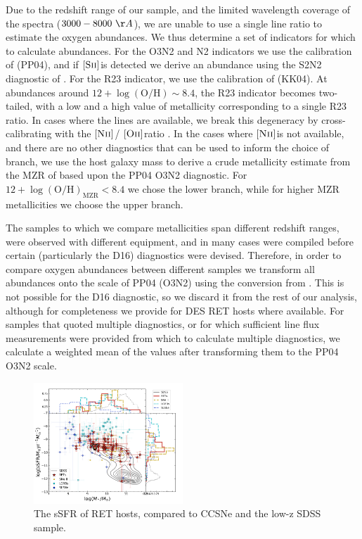 \documentclass[fleqn,usenatbib,]{mnras}
\newcommand{\OII}[0]{$[\textnormal{\textsc{Oii}}]$}
\newcommand{\SII}[0]{$[\textnormal{\textsc{Sii}}]$}
\newcommand{\NII}[0]{$[\textnormal{\textsc{Nii}}]$}
\begin{document}
Due to the redshift range of our sample, and the limited wavelength coverage of the spectra ($3000-8000~\AA$), we are unable to use a single line ratio to estimate the oxygen abundances. We thus determine a set of indicators for which to calculate abundances. For the O3N2 and N2 indicators we use the calibration of \citet{Pettini2004} (PP04), and if \SII is detected we derive an abundance using the S2N2 diagnostic of \citet{Dopita2016}. For the R23 indicator, we use the calibration of \citet{Kobulnicky2004} (KK04). At abundances around $12 + \log \mathrm{(O/H)} \sim 8.4$, the R23 indicator becomes two-tailed, with a low and a high value of metallicity corresponding to a single R23 ratio. In cases where the lines are available, we break this degeneracy by cross-calibrating with the \NII / \OII ratio \citep{Kewley2008}. In the cases where \NII is not available, and there are no other diagnostics that can be used to inform the choice of branch, we use the host galaxy mass to derive a crude metallicity estimate from the MZR of \citet{Kewley2008} based upon the PP04 O3N2 diagnostic. For $12 + \log \mathrm{(O/H)}_{\mathrm{MZR}} < 8.4$ we chose the lower branch, while for higher MZR metallicities we choose the upper branch.

The samples to which we compare metallicities span different redshift ranges, were observed with different equipment, and in many cases were compiled before certain (particularly the D16) diagnostics were devised. Therefore, in order to compare oxygen abundances between different samples we transform all abundances onto the scale of PP04 (O3N2) using the conversion from \citet{Kewley2008}. This is not possible for the D16 diagnostic, so we discard it from the rest of our analysis, although for completeness we provide for DES RET hosts where available. For samples that quoted multiple diagnostics, or for which sufficient line flux measurements were provided from which to calculate multiple diagnostics, we calculate a weighted mean of the values after transforming them to the PP04 O3N2 scale.

\begin{figure}
\includegraphics[width=0.5\textwidth]{figs/sSFR_Mike.png}
\caption{The sSFR of RET hosts, compared to CCSNe and the low-z SDSS sample.
\label{fig:sfms_ssfr}}
\end{figure}
\end{document}
